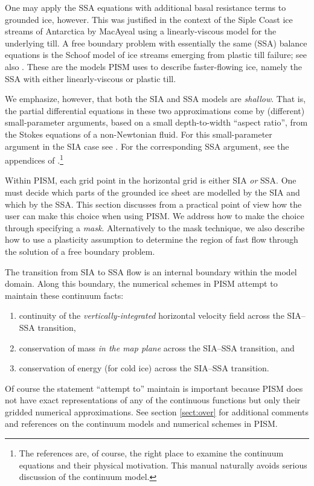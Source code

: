\documentclass[11pt,final]{amsart}
\begin{document}
One may apply the SSA equations with additional basal resistance terms to grounded ice, however.  This was justified in the context of the Siple Coast ice streams of Antarctica by MacAyeal \cite{MacAyeal,HulbeMacAyeal} using a linearly-viscous model for the underlying till.  A free boundary problem with essentially the same (SSA) balance equations is the Schoof \cite{SchoofStream} model of ice streams emerging from plastic till failure; see also \cite{SchoofTill}.  These are the models PISM uses to describe faster-flowing ice, namely the SSA with either linearly-viscous or plastic till.

We emphasize, however, that both the SIA and SSA models are \emph{shallow}.  That is, the partial differential equations in these two approximations come by (different) small-parameter arguments, based on a small depth-to-width ``aspect ratio'', from the Stokes equations of a non-Newtonian fluid.  For this small-parameter argument in the SIA case see \cite{Fowler}.  For the corresponding SSA argument, see the appendices of \cite{SchoofStream}.\footnote{The references are, of course, the right place to examine the continuum equations and their physical motivation.  This manual naturally avoids serious discussion of the continuum model.}

Within PISM, each grid point in the horizontal grid is either SIA \emph{or} SSA.  One must decide which parts of the grounded ice sheet are modelled by the SIA and which by the SSA.  This section discusses from a practical point of view how the user can make this choice when using PISM.  We address how to make the choice through specifying a \emph{mask}.  Alternatively to the mask technique, we also describe how to use a plasticity assumption to determine the region of fast flow through the solution of a free boundary problem.

The transition from SIA to SSA flow is an internal boundary within the model domain.  Along this boundary, the numerical schemes in PISM attempt to maintain these continuum facts:
\renewcommand{\labelenumi}{\textbf{\roman{enumi})}~}
\begin{enumerate}
\item continuity of the \emph{vertically-integrated} horizontal velocity field across the SIA--SSA transition,
\item conservation of mass \emph{in the map plane} across the SIA--SSA transition, and
\item conservation of energy (for cold ice) across the SIA--SSA transition.
\end{enumerate}
Of course the statement ``attempt to'' maintain is important because PISM does not have exact representations of any of the continuous functions but only their gridded numerical approximations.  See section \ref{sect:over} for additional comments and references on the continuum models and numerical schemes in PISM.
\end{document}
